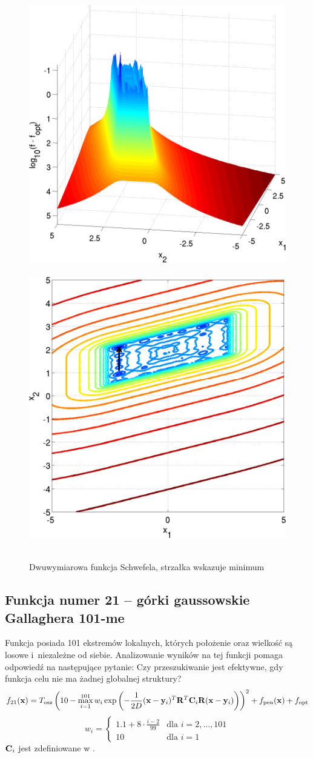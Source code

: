 \documentclass[a4paper,onecolumn,oneside,12pt,wide,floatssmall]{mwrep}
\theoremstyle{definition}
\theoremstyle{plain}%
\theoremstyle{remark}
\begin{document}
\begin{figure}[H]
\centering
\mbox{
\includegraphics[width=.45\textwidth]{img/20.png} \quad
\includegraphics[width=.45\textwidth]{img/20a.png} 
}
\caption{Dwuwymiarowa funkcja Schwefela, strzałka wskazuje minimum \cite{noiseless}}
\end{figure}

\subsection{Funkcja numer 21 -- górki gaussowskie Gallaghera 101-me}

Funkcja posiada 101 ekstremów lokalnych, których położenie oraz wielkość są losowe i~niezależne od siebie.
Analizowanie wyników na tej funkcji pomaga odpowiedź na następujące pytanie: Czy przeszukiwanie jest efektywne, gdy funkcja celu
nie ma żadnej globalnej struktury?
$$ f_{21}(\bold{x}) = T_\text{osz}\left(10-\max_{i=1}^{101}w_i\exp\left(-\frac{1}{2D}(\bold{x}-\bold{y}_i)^T\bold{R}^T\bold{C}_i\bold{R}(\bold{x}-\bold{y}_i)\right)\right)^2 + f_\text{pen}(\bold{x}) + f_\text{opt} $$
\[
w_i =
\begin{cases} 
1.1 + 8 \cdot \frac{i-2}{99} & \mbox{dla } i = 2, \dots, 101 \\ 
10 & \mbox{dla } i = 1
\end{cases}
\] 
$\bold{C}_i$ jest zdefiniowane w \cite{noiseless}. 
\end{document}
